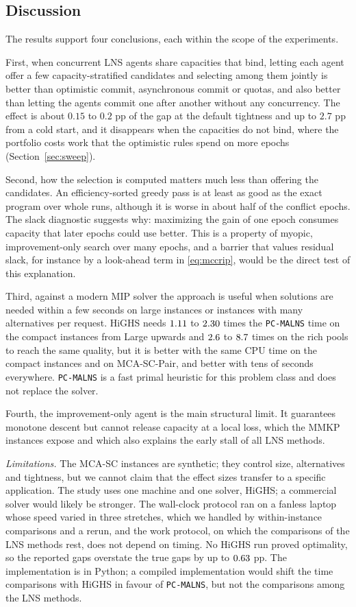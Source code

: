 \documentclass[a4paper,fleqn]{cas-sc}
\newcommand{\pcm}{\texttt{PC-MALNS}}
\begin{document}
\FloatBarrier
\subsection{Discussion}
\label{sec:discussion}
The results support four conclusions, each within the scope of the experiments.

First, when concurrent LNS agents share capacities that bind, letting each agent offer a few capacity-stratified candidates and selecting among them jointly is better than optimistic commit, asynchronous commit or quotas, and also better than letting the agents commit one after another without any concurrency. The effect is about $0.15$ to $0.2$ pp of the gap at the default tightness and up to $2.7$ pp from a cold start, and it disappears when the capacities do not bind, where the portfolio costs work that the optimistic rules spend on more epochs (Section~\ref{sec:sweep}).

Second, how the selection is computed matters much less than offering the candidates. An efficiency-sorted greedy pass is at least as good as the exact program over whole runs, although it is worse in about half of the conflict epochs. The slack diagnostic suggests why: maximizing the gain of one epoch consumes capacity that later epochs could use better. This is a property of myopic, improvement-only search over many epochs, and a barrier that values residual slack, for instance by a look-ahead term in \eqref{eq:mccrip}, would be the direct test of this explanation.

Third, against a modern MIP solver the approach is useful when solutions are needed within a few seconds on large instances or instances with many alternatives per request. HiGHS needs $1.11$ to $2.30$ times the \pcm{} time on the compact instances from Large upwards and $2.6$ to $8.7$ times on the rich pools to reach the same quality, but it is better with the same CPU time on the compact instances and on MCA-SC-Pair, and better with tens of seconds everywhere. \pcm{} is a fast primal heuristic for this problem class and does not replace the solver.

Fourth, the improvement-only agent is the main structural limit. It guarantees monotone descent but cannot release capacity at a local loss, which the MMKP instances expose and which also explains the early stall of all LNS methods.

\textit{Limitations.} The MCA-SC instances are synthetic; they control size, alternatives and tightness, but we cannot claim that the effect sizes transfer to a specific application. The study uses one machine and one solver, HiGHS; a commercial solver would likely be stronger. The wall-clock protocol ran on a fanless laptop whose speed varied in three stretches, which we handled by within-instance comparisons and a rerun, and the work protocol, on which the comparisons of the LNS methods rest, does not depend on timing. No HiGHS run proved optimality, so the reported gaps overstate the true gaps by up to $0.63$ pp. The implementation is in Python; a compiled implementation would shift the time comparisons with HiGHS in favour of \pcm, but not the comparisons among the LNS methods.
\end{document}
